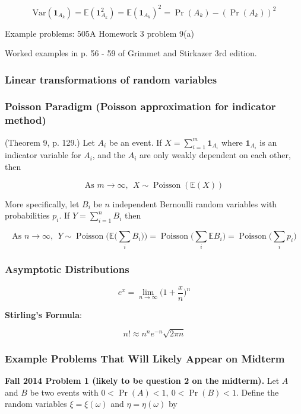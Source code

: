\documentclass{article}
\newcommand{\E}{\mathbb{E}}
\newcommand{\Var}{\mathrm{Var}}
\begin{document}
\[
\Var(\boldsymbol{1}_{A_k} ) = \E(\boldsymbol{1}_{A_k} ^2) = \E(\boldsymbol{1}_{A_k} )^2 = \Pr(A_k) - (\Pr(A_k))^2
\]

Example problems: 505A Homework 3 problem 9(a)

Worked examples in p. 56 - 59 of Grimmet and Stirkazer 3rd edition.

\subsubsection{Linear transformations of random variables}

\subsubsection{Poisson Paradigm (Poisson approximation for indicator method)}

(Theorem 9, p. 129.) Let \(A_i\) be an event. If \(X = \sum_{i=1}^m \boldsymbol{1}_{A_i}\) where \(\boldsymbol{1}_{A_i}\) is an indicator variable for \(A_i\), and the \(A_i\) are only weakly dependent on each other, then 

\[
\text{As } m \to \infty, \ \ X \sim \operatorname{Poisson}(\E(X))
\]

More specifically, let \(B_i\) be \(n\) independent Bernoulli random variables with probabilities \(p_i\). If \(Y = \sum_{i=1}^n B_i\) then 

\[
\text{As } n \to \infty, \ \ Y \sim \operatorname{Poisson} \bigg(\E \bigg(\sum_i B_i \bigg) \bigg) = \operatorname{Poisson}\bigg(\sum_i \E B_i \bigg) = \operatorname{Poisson}\bigg(\sum_i p_i \bigg) 
\]

\subsubsection{Asymptotic Distributions}

\[
e^x = \lim_{n \to \infty} \bigg( 1 + \frac{x}{n}\bigg)^n
\]

\textbf{Stirling's Formula}: 

\[
n! \approx n^ne^{-n} \sqrt{2\pi n}
\]

\subsubsection{Example Problems That Will Likely Appear on Midterm}

\textbf{Fall 2014 Problem 1 (likely to be question 2 on the midterm).} Let \(A\) and \(B\) be two events with \(0 < \Pr(A) < 1, \ 0 < \Pr(B) < 1\). Define the random variables \(\xi = \xi(\omega)\) and \(\eta = \eta(\omega)\) by
\end{document}
